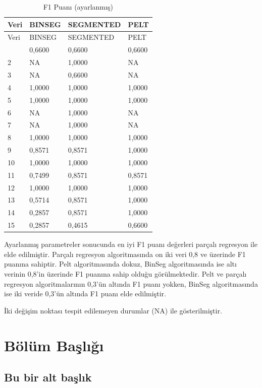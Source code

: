 \documentclass[12pt,twoside]{deuthesis}
\begin{document}
\begin{longtable}[]{@{}llll@{}}
\caption{\label{tab:nvar7} F1 Puanı (ayarlanmış)}\tabularnewline
\toprule\noalign{}
Veri & BINSEG & SEGMENTED & PELT \\
\midrule\noalign{}
\endfirsthead
\toprule\noalign{}
Veri & BINSEG & SEGMENTED & PELT \\
\midrule\noalign{}
\endhead
\bottomrule\noalign{}
\endlastfoot
1 & 0,6600 & 0,6600 & 0,6600 \\
2 & NA & 1,0000 & NA \\
3 & NA & 0,6600 & NA \\
4 & 1,0000 & 1,0000 & 1,0000 \\
5 & 1,0000 & 1,0000 & 1,0000 \\
6 & NA & 1,0000 & NA \\
7 & NA & 1,0000 & NA \\
8 & 1,0000 & 1,0000 & 1,0000 \\
9 & 0,8571 & 0,8571 & 1,0000 \\
10 & 1,0000 & 1,0000 & 1,0000 \\
11 & 0,7499 & 0,8571 & 0,8571 \\
12 & 1,0000 & 1,0000 & 1,0000 \\
13 & 0,5714 & 0,8571 & 1,0000 \\
14 & 0,2857 & 0,8571 & 1,0000 \\
15 & 0,2857 & 0,4615 & 0,6600 \\
\end{longtable}

Ayarlanmış parametreler sonucunda en iyi F1 puanı değerleri parçalı regresyon ile elde edilmiştir. Parçalı regresyon algoritmasında on iki veri 0,8 ve üzerinde F1 puanına sahiptir. Pelt algoritmasında dokuz, BinSeg algoritmasında ise altı verinin 0,8'in üzerinde F1 puanına sahip olduğu görülmektedir.
Pelt ve parçalı regresyon algoritmalarının 0,3'ün altında F1 puanı yokken, BinSeg algoritmasında ise iki veride 0,3'ün altında F1 puanı elde edilmiştir.

İki değişim noktası tespit edilemeyen durumlar (NA) ile gösterilmiştir.

\hypertarget{Bolum4}{%
\chapter{Bölüm Başlığı}\label{Bolum4}}

\hypertarget{bu-bir-alt-baux15flux131k}{%
\section{Bu bir alt başlık}\label{bu-bir-alt-baux15flux131k}}
\end{document}
